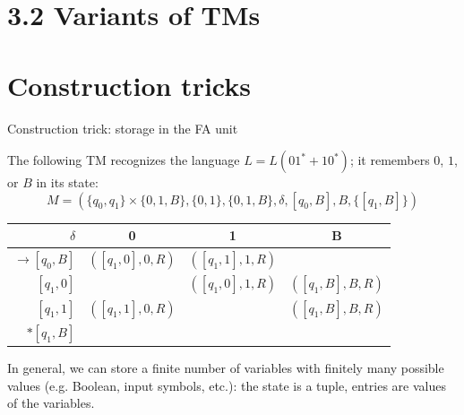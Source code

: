 \documentclass[handout]{beamer}
\begin{document}
\section{3.2 Variants of TMs}


\section*{Construction tricks}


\begin{frame}{Construction trick: storage in the FA unit}

    The following TM recognizes the language $L=L(01^*+10^*)$; it remembers $0$, $1$, or $B$ in its state:
    $$
    M=(\{q_0,q_1\}\times\{0,1,B\},\{0,1\},\{0,1,B\},\delta,[q_0,B],B,\{[q_1,B]\})
    $$
    \begin{center}
        \begin{tabular}{r |c |c |c }
        $\delta$ & 0 & 1 & B \\
        \hline\hline
        $\rightarrow[q_0,B]$& $([q_1,0],0,R)$& $([q_1,1],1,R)$& \\
        $[q_1,0]$& & $([q_1,0],1,R)$& $([q_1,B],B,R)$ \\
        $[q_1,1]$& $([q_1,1],0,R)$& &$([q_1,B],B,R)$ \\
        $*[q_1,B]$ & & &
        \end{tabular}
    \end{center}

    In general, we can store a finite number of variables with finitely many possible values (e.g. Boolean, input symbols, etc.): the state is a tuple, entries are values of the variables.
    
\end{frame}
\end{document}
